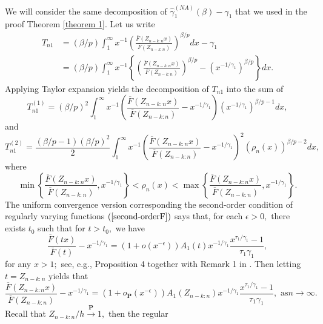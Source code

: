 \documentclass[reqno,openbib,runningheads,a4paper,12pt]{amsart}%
\begin{document}
We will consider the same decomposition of $\widehat{\gamma}_{1}^{\left(
NA\right)  }\left(  \beta\right)  -\gamma_{1}$ that we used in the proof
Theorem \ref{theorem 1}. Let us write
\begin{align*}
T_{n1} &  =\left(  \beta/p\right)  \int_{1}^{\infty}x^{-1}\left(
\frac{\overline{F}\left(  Z_{n-k:n}x\right)  }{\overline{F}\left(
Z_{n-k:n}\right)  }\right)  ^{\beta/p}dx-\gamma_{1}\\
&  =\left(  \beta/p\right)  \int_{1}^{\infty}x^{-1}\left\{  \left(
\frac{\overline{F}\left(  Z_{n-k:n}x\right)  }{\overline{F}\left(
Z_{n-k:n}\right)  }\right)  ^{\beta/p}-\left(  x^{-1/\gamma_{1}}\right)
^{\beta/p}\right\}  dx.
\end{align*}
Applying Taylor expansion yields the decomposition of $T_{n1}$ into the sum
of
\[
T_{n1}^{\left(  1\right)  }=\left(  \beta/p\right)  ^{2}\int_{1}^{\infty
}x^{-1}\left(  \frac{\overline{F}\left(  Z_{n-k:n}x\right)  }{\overline
{F}\left(  Z_{n-k:n}\right)  }-x^{-1/\gamma_{1}}\right)  \left(
x^{-1/\gamma_{1}}\right)  ^{\beta/p-1}dx,
\]
and
\[
T_{n1}^{\left(  2\right)  }=\frac{\left(  \beta/p-1\right)  \left(
\beta/p\right)  ^{2}}{2}\int_{1}^{\infty}x^{-1}\left(  \frac{\overline
{F}\left(  Z_{n-k:n}x\right)  }{\overline{F}\left(  Z_{n-k:n}\right)
}-x^{-1/\gamma_{1}}\right)  ^{2}\left(  \rho_{n}\left(  x\right)  \right)
^{\beta/p-2}dx,
\]
where
\[
\min\left\{  \frac{\overline{F}\left(  Z_{n-k:n}x\right)  }{\overline
{F}\left(  Z_{n-k:n}\right)  },x^{-1/\gamma_{1}}\right\}  <\rho_{n}\left(
x\right)  <\max\left\{  \frac{\overline{F}\left(  Z_{n-k:n}x\right)
}{\overline{F}\left(  Z_{n-k:n}\right)  },x^{-1/\gamma_{1}}\right\}  .
\]
The uniform convergence version corresponding the second-order condition of
regularly varying functions $\left(  \ref{second-orderF}\right)  $ says that,
for each $\epsilon>0,$ there exists $t_{0}$ such that for $t>t_{0},$ we have%
\[
\frac{\overline{F}\left(  tx\right)  }{\overline{F}\left(  t\right)
}-x^{-1/\gamma_{1}}=\left(  1+o\left(  x^{-\epsilon}\right)  \right)
A_{1}\left(  t\right)  x^{-1/\gamma_{1}}\frac{x^{\tau_{1}/\gamma_{1}}-1}%
{\tau_{1}\gamma_{1}},
\]
for any $x>1;$ see, e.g., Proposition 4 together with Remark 1 in
\cite{HJ2011}. Then letting $t=Z_{n-k:n}$ yields that
\[
\frac{\overline{F}\left(  Z_{n-k:n}x\right)  }{\overline{F}\left(
Z_{n-k:n}\right)  }-x^{-1/\gamma_{1}}=\left(  1+o_{\mathbf{P}}\left(
x^{-\epsilon}\right)  \right)  A_{1}\left(  Z_{n-k:n}\right)  x^{-1/\gamma
_{1}}\frac{x^{\tau_{1}/\gamma_{1}}-1}{\tau_{1}\gamma_{1}},\text{ as
}n\rightarrow\infty.
\]
Recall that $Z_{n-k:n}/h\overset{\mathbf{P}}{\rightarrow}1,$ then the regular
\end{document}
